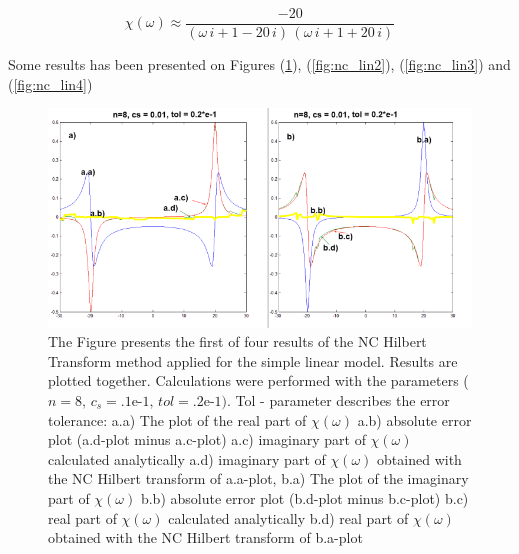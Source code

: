 \documentclass[12pt,twoside,a4paper]{article}
\numberwithin{equation}{subsection}
\numberwithin{figure}{subsection}
\begin{document}
\begin{equation} \label{eq:nc_algoritm}
  \chi (\omega ) \approx \frac { - 20}{(\omega \,i + 1 - 20\,i)\,(\omega \,i + 1 + 20\,i)}
\end{equation} 

Some results has been presented on Figures (\ref{fig:nc_lin1}), (\ref{fig:nc_lin2}), (\ref{fig:nc_lin3}) and (\ref{fig:nc_lin4})

\begin{figure}
  \includegraphics[width=150mm]{img/nc_lin1.png}
   \caption{ The Figure presents the first of four results of the NC Hilbert Transform method applied for the simple linear model. Results
   are plotted together. Calculations were performed with the parameters ($n = 8, \, c_s = \mbox{.1e-1}, \, tol = \mbox{.2e-1})$. Tol -
   parameter describes the error tolerance:
     a.a) The plot of the real part of $\chi (\omega )$ 
     a.b) absolute error plot (a.d-plot minus a.c-plot) 
     a.c) imaginary part of $\chi (\omega )$ calculated analytically 
     a.d) imaginary part of $\chi (\omega )$ obtained with the NC Hilbert transform of a.a-plot, 
     b.a) The plot of the imaginary part of $\chi (\omega )$ 
     b.b) absolute error plot (b.d-plot minus b.c-plot) 
     b.c) real part of $\chi (\omega )$ calculated analytically 
     b.d) real part of $\chi (\omega )$ obtained with the NC Hilbert transform of b.a-plot 
     \label{fig:nc_lin1}
  }
\end{figure}
\end{document}
